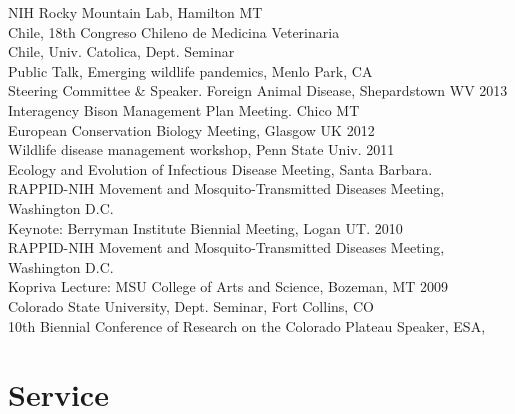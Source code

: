 \documentclass[12pt,]{article}
\begin{document}
NIH Rocky Mountain Lab, Hamilton MT\\
Chile, 18th Congreso Chileno de Medicina Veterinaria\\
Chile, Univ. Catolica, Dept. Seminar\\
Public Talk, Emerging wildlife pandemics, Menlo Park, CA\\
Steering Committee \& Speaker. Foreign Animal Disease, Shepardstown WV
\hfill 2013\\
Interagency Bison Management Plan Meeting. Chico MT\\
European Conservation Biology Meeting, Glasgow UK \hfill 2012\\
Wildlife disease management workshop, Penn State Univ. \hfill 2011\\
Ecology and Evolution of Infectious Disease Meeting, Santa Barbara.\\
RAPPID-NIH Movement and Mosquito-Transmitted Diseases Meeting,
Washington D.C.\\
Keynote: Berryman Institute Biennial Meeting, Logan UT. \hfill 2010\\
RAPPID-NIH Movement and Mosquito-Transmitted Diseases Meeting,
Washington D.C.\\
Kopriva Lecture: MSU College of Arts and Science, Bozeman, MT
\hfill 2009\\
Colorado State University, Dept. Seminar, Fort Collins, CO\\
10th Biennial Conference of Research on the Colorado Plateau Speaker,
ESA,

\hypertarget{service}{%
\section{Service}\label{service}}
\end{document}
